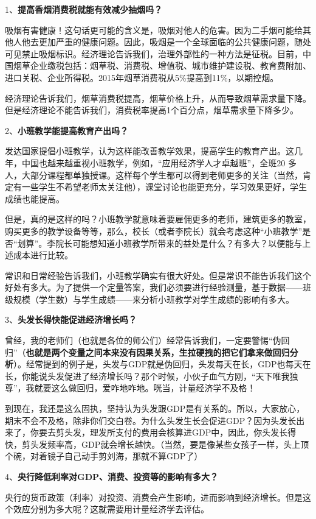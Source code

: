 \documentclass[cn,12pt,math=newtx,citestyle=gb7714-2015,bibstyle=gb7714-2015]{elegantbook}
\begin{document}
	1、\textbf{提高香烟消费税就能有效减少抽烟吗？}
	
	吸烟有害健康！这句话更可能的含义是，吸烟对他人的危害。因为二手烟可能给其他人他去更加严重的健康问题。因此，吸烟是一个全球面临的公共健康问题，随处可见禁止吸烟标识。经济理论告诉我们，治理外部性的一种方法是征税。目前，中国烟草企业缴税包括：烟草税、消费税、增值税、城市维护建设税、教育费附加、进口关税、企业所得税。2015年烟草消费税从5\%提高到11\%，以期控烟。
	
	经济理论告诉我们，烟草消费税提高，烟草价格上升，从而导致烟草需求量下降。但是经济理论不能告诉我们，消费税率提高1个百分点，烟草需求量下降多少。
	
	2、\textbf{小班教学能提高教育产出吗？}
	
	发达国家提倡小班教学，认为这样能改善教学效果，提高学生的教育产出。这几年，中国也越来越重视小班教学，例如，“应用经济学人才卓越班”，全班20 多人，大部分课程都单独授课。这样每个学生都可以得到老师更多的关注（当然，肯定有一些学生不希望老师太关注他），课堂讨论也能更充分，学习效果更好，学生成绩也能提高。
	
	但是，真的是这样的吗？小班教学就意味着要雇佣更多的老师，建筑更多的教室，购买更多的教学设备等等，那么，校长（或者李院长）就会考虑这种“小班教学”是否“划算”。李院长可能想知道小班教学所带来的益处是什么？有多大？以便能与上述成本进行比较。
	
	常识和日常经验告诉我们，小班教学确实有很大好处。但是常识不能告诉我们这个好处有多大。为了提供一个定量答案，我们必须要进行经验测量，基于数据——班级规模（学生数）与学生成绩——来分析小班教学对学生成绩的影响有多大。
	
	3、\textbf{头发长得快能促进经济增长吗？}
	
	曾经，我的老师们（也就是各位的师公们）经常告诉我们，一定要警惕“伪回归”（\textbf{也就是两个变量之间本来没有因果关系，生拉硬拽的把它们拿来做回归分析}）。经常提到的例子是，头发与GDP就是伪回归，头发每天在长，GDP也每天在长，你能说头发促进了经济增长吗？那个时候，小伙子血气方刚，“天下唯我独尊”，我就要这么做回归，爱咋地咋地。咣当，计量经济学不及格！
	
	到现在，我还是这么固执，坚持认为头发跟GDP是有关系的。所以，大家放心，期末不会不及格，除非你们交白卷。为什么头发生长会促进GDP？因为头发长出来了，你要去剪头发，理发所支付的费用会核算进GDP中，因此，你头发长得快，剪头发频率高，GDP就会增长越快。（当然，要是像某些女孩子一样，头上顶个碗，对着镜子自己动手剪刘海，那就不算GDP了）
	
	4、\textbf{央行降低利率对GDP、消费、投资等的影响有多大？}
	
	央行的货币政策（利率）对投资、消费会产生影响，进而影响到经济增长。但是这个效应分别为多大呢？这就需要用计量经济学去评估。
	
\end{document}
